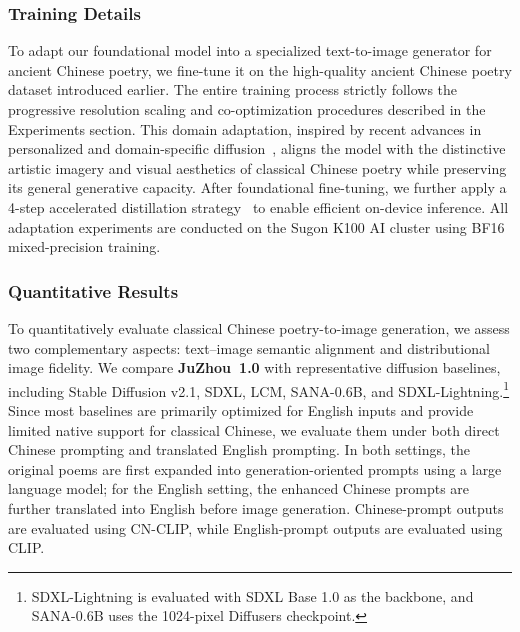 \subsubsection{Training Details}
\label{sec:TrainingDetails}
To adapt our foundational model into a specialized text-to-image generator for ancient Chinese poetry, we fine-tune it on the high-quality ancient Chinese poetry dataset introduced earlier. The entire training process strictly follows the progressive resolution scaling and co-optimization procedures described in the Experiments section. This domain adaptation, inspired by recent advances in personalized and domain-specific diffusion~\cite{ruiz2023dreambooth,gal2022textual,hu2023animate}, aligns the model with the distinctive artistic imagery and visual aesthetics of classical Chinese poetry while preserving its general generative capacity. After foundational fine-tuning, we further apply a 4-step accelerated distillation strategy~\cite{luo2023lcm,luo2023lcm_loRA,hu2024lora} to enable efficient on-device inference. All adaptation experiments are conducted on the Sugon K100 AI cluster using BF16 mixed-precision training.

\subsubsection{Quantitative Results} 
\label{sec:QuantitativeResults} 
To quantitatively evaluate classical Chinese poetry-to-image generation, we assess two complementary aspects: text--image semantic alignment and distributional image fidelity. We compare \textbf{JuZhou~1.0} with representative diffusion baselines, including Stable Diffusion v2.1, SDXL, LCM, SANA-0.6B, and SDXL-Lightning.\footnote{SDXL-Lightning is evaluated with SDXL Base 1.0 as the backbone, and SANA-0.6B uses the 1024-pixel Diffusers checkpoint.}
Since most baselines are primarily optimized for English inputs and provide limited native support for classical Chinese, we evaluate them under both direct Chinese prompting and translated English prompting. In both settings, the original poems are first expanded into generation-oriented prompts using a large language model; for the English setting, the enhanced Chinese prompts are further translated into English before image generation. Chinese-prompt outputs are evaluated using CN-CLIP, while English-prompt outputs are evaluated using CLIP.

